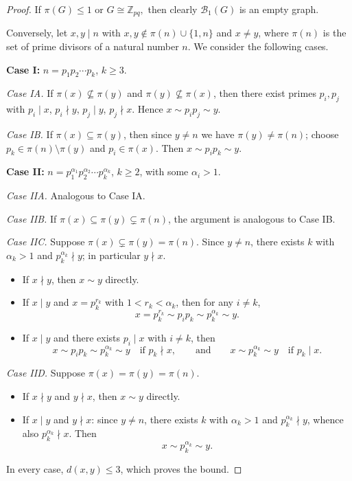 \documentclass[10pt,a4paper]{amsart}
\begin{document}
\begin{proof}
If $\pi(G) \leq 1$ or $G \cong \mathbb{Z}_{pq},$ then clearly $\mathcal{B}_1(G)$ is an empty graph.

Conversely,
let $x, y \mid n$ with $x, y \notin \pi(n) \cup \{1, n\}$ and $x \neq y$, where $\pi(n)$ is the set of prime divisors of a natural number $n$. We consider the following cases.

\medskip
\noindent\textbf{Case I:} $n = p_1 p_2 \cdots p_k$, $k \geq 3.$ 

\smallskip
\noindent\textit{Case IA.} If $\pi(x) \not\subseteq \pi(y)$ and $\pi(y) \not\subseteq \pi(x)$, then there exist primes $p_i, p_j$ with $p_i \mid x$, $p_i \nmid y$, $p_j \mid y$, $p_j \nmid x$. Hence
$x \sim p_ip_j \sim y.$

\smallskip
\noindent\textit{Case IB.} If $\pi(x) \subseteq \pi(y)$, then since $y \neq n$ we have $\pi(y) \neq \pi(n)$; choose $p_k \in \pi(n) \setminus \pi(y)$ and $p_i \in \pi(x)$. Then $x \sim p_ip_k \sim y.$

\medskip
\noindent\textbf{Case II:} $n = p_1^{\alpha_1}p_2^{\alpha_2}\cdots p_k^{\alpha_k}$, $k \geq 2$, with some $\alpha_i > 1$.

\smallskip
\noindent\textit{Case IIA.} Analogous to Case IA.

\smallskip
\noindent\textit{Case IIB.} If $\pi(x) \subseteq \pi(y) \subsetneq \pi(n)$, the argument is analogous to Case IB.

\smallskip
\noindent\textit{Case IIC.} Suppose $\pi(x) \subsetneq \pi(y) = \pi(n)$. Since $y \neq n$, there exists $k$ with $\alpha_k > 1$ and $p_k^{\alpha_k} \nmid y$; in particular $y \nmid x$.
\begin{itemize}
\item If $x \nmid y$, then $x \sim y$ directly.
\item If $x \mid y$ and $x = p_k^{r_k}$ with $1 < r_k < \alpha_k$, then for any $i \neq k$,
\[
x = p_k^{r_k} \sim p_ip_k \sim p_k^{\alpha_k} \sim y.
\]
\item If $x \mid y$ and there exists $p_i \mid x$ with $i \neq k$, then
\[
x \sim p_ip_k \sim p_k^{\alpha_k} \sim y \quad \text{if } p_k \nmid x, \qquad\text{and}\qquad x \sim p_k^{\alpha_k} \sim y \quad \text{if } p_k \mid x.
\]
\end{itemize}

\smallskip
\noindent\textit{Case IID.} Suppose $\pi(x) = \pi(y) = \pi(n)$.
\begin{itemize}
\item If $x \nmid y$ and $y \nmid x$, then $x \sim y$ directly.
\item If $x \mid y$ and $y \nmid x$: since $y \neq n$, there exists $k$ with $\alpha_k > 1$ and $p_k^{\alpha_k} \nmid y$, whence also $p_k^{\alpha_k} \nmid x$. Then
\[
x \sim p_k^{\alpha_k} \sim y.
\]
\end{itemize}

In every case, $d(x,y) \leq 3$, which proves the bound.
\end{proof}
\end{document}
